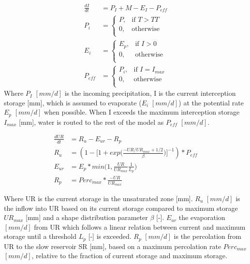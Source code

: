 {\begin{align}
	\frac{dI}{dt} &= P_I + M - E_I  - P_{eff}\\
	P_i &= \begin{cases}
		P, &\text{if } T > TT \\
		0, & \text{otherwise} \\
	\end{cases} \\
	E_i &= \begin{cases}
		E_p, &\text{if } I > 0 \\
		0, &\text{otherwise} \\
	\end{cases} \\
	P_{eff} &= \begin{cases}
		P_i, &\text{if } I = I_{max}\\
		0, &\text{otherwise}\\
	\end{cases}	
\end{align}
} %
Where $P_I$  $[mm/d]$ is the incoming precipitation, I is the current interception storage [mm], which is assumed to evaporate ($E_i$ $[mm/d]$) at the potential rate $E_p$ $[mm/d]$ when possible. When I exceeds the maximum interception storage $I_{max}$ [mm], water is routed to the rest of the model as $P_{eff}$ $[mm/d]$. 

\begin{align}
	\frac{dUR}{dt} &= R_u - E_{ur} - R_p \\
	R_u &= (1 - \Big[1+exp\Big(\frac{-UR/UR_{max} + 1/2}{\beta}\Big)\Big]^{-1}) * P_{eff}\\
	E_{ur} &= E_p * min\Big(1, \frac{UR}{UR_{max}} \frac{1}{L_p}\Big)\\
	R_p &= Perc_{max} * \frac{-UR}{UR_{max}}
\end{align}
  
Where UR is the current storage in the unsaturated zone [mm]. $R_u$  $[mm/d]$ is the inflow into UR based on its current storage compared to maximum storage $UR_{max}$ [mm] and a shape distribution parameter $\beta$ [-]. $E_{ur}$ the evaporation $[mm/d]$ from UR which follows a linear relation between current and maximum storage until a threshold $L_p$ [-] is exceeded. $R_p$ $[mm/d]$ is the percolation from UR to the slow reservoir SR [mm], based on a maximum percolation rate $Perc_{max}$ $[mm/d]$, relative to the fraction of current storage and maximum storage.

